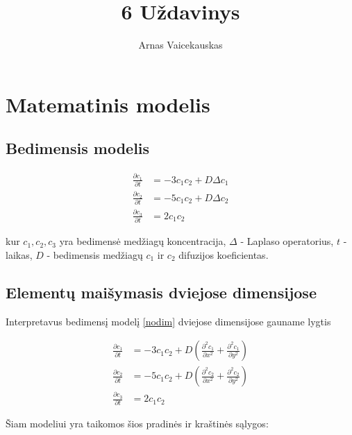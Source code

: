 \documentclass{article}
\title{6 Uždavinys}
\author{Arnas Vaicekauskas}
\begin{document}
\maketitle

\section{Matematinis modelis}

\subsection{Bedimensis modelis}

\begin{subequations} \label{nodim}
    \begin{align}
    \frac{\partial c_1}{\partial t}&=-3c_1c_2+D\Delta c_1\\
    \frac{\partial c_2}{\partial t}&=-5c_1c_2+D\Delta c_2\\
    \frac{\partial c_3}{\partial t}&=2c_1c_2
    \end{align}
\end{subequations}

kur $c_1,c_2,c_3$ yra bedimensė medžiagų koncentracija, 
$\Delta$ - Laplaso operatorius, $t$ - laikas, 
$D$ - bedimensis medžiagų $c_1$ ir $c_2$ difuzijos koeficientas.

\subsection{Elementų maišymasis dviejose dimensijose}

Interpretavus bedimensį modelį \eqref{nodim} dviejose dimensijose gauname lygtis

\begin{subequations} \label{rect}
    \begin{align}
    \frac{\partial c_1}{\partial t}&=-3c_1c_2+D\left(\frac{\partial^2c_1}{\partial x^2}+\frac{\partial^2c_1}{\partial y^2}\right)\\
    \frac{\partial c_2}{\partial t}&=-5c_1c_2+D\left(\frac{\partial^2c_2}{\partial x^2}+\frac{\partial^2c_2}{\partial y^2}\right)\\
    \frac{\partial c_3}{\partial t}&=2c_1c_2
    \end{align}
\end{subequations}

Šiam modeliui yra taikomos šios pradinės ir kraštinės sąlygos:
\end{document}
